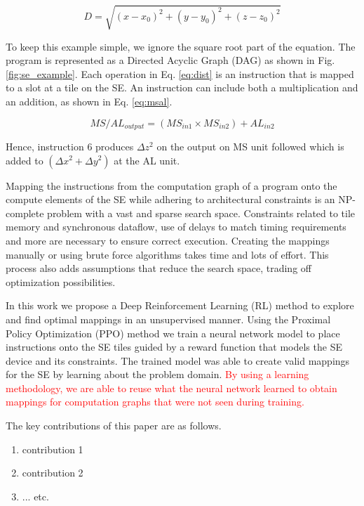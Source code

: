 \begin{equation}
    \label{eq:dist}
    D = \sqrt{(x - x_0)^2 +(y - y_0)^2 + (z - z_0)^2}
\end{equation}

To keep this example simple, we ignore the square root part of the equation.
The program is represented as a Directed Acyclic Graph (DAG) as shown in Fig. \ref{fig:se_example}.
Each operation in Eq. \ref{eq:dist} is an instruction that is mapped to a slot at a tile on the SE.
An instruction can include both a multiplication and an addition, as shown in Eq. \ref{eq:msal}.

\begin{equation}
    \label{eq:msal}
    MS/AL_{output} = (MS_{in1} \times MS_{in2}) + AL_{in2} 
\end{equation}

Hence, instruction 6 produces $\Delta z^2$ on the output on MS unit followed which is added to $(\Delta x^2 + \Delta y^2)$ at the AL unit.


Mapping the instructions from the computation graph of a program onto the compute elements of the SE while adhering to architectural constraints is an NP-complete problem with a vast and sparse search space. 
Constraints related to tile memory and synchronous dataflow, use of delays to match timing requirements and more are necessary to ensure correct execution. 
Creating the mappings manually or using brute force algorithms takes time and lots of effort. 
This process also adds assumptions that reduce the search space, trading off optimization possibilities.  

In this work we propose a Deep Reinforcement Learning (RL) method to explore and find optimal mappings in an unsupervised manner. 
Using the Proximal Policy Optimization (PPO) method we train a neural network model to place instructions onto the SE tiles guided by a reward function that models the SE device and its constraints. 
The trained model was able to create valid mappings for the SE by learning about the problem domain. 
\textcolor{red}{By using a learning methodology, we are able to reuse what the neural network learned to obtain mappings for computation graphs that were not seen during training.}  


The key contributions of this paper are as follows.
\begin{enumerate}
    \item contribution 1
    \item contribution 2
    \item ... etc.
\end{enumerate}



